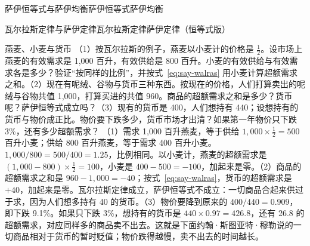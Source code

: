 \begin{compare}{萨伊恒等式与萨伊均衡}{萨伊恒等式}{萨伊均衡}
\end{compare}

\begin{compare}{瓦尔拉斯定律与萨伊定律}{瓦尔拉斯定律}{萨伊定律（恒等式版）}
\end{compare}

\begin{example}{燕麦、小麦与货币}\label{ex:say-walras}
（1）按瓦尔拉斯的例子，燕麦以小麦计的价格是 $\tfrac12$。设市场上燕麦的有效需求是 1,000 百升，有效供给是 800 百升。小麦的有效供给与有效需求各是多少？验证“按同样的比例”，并按式~\eqref{eq:say-walras} 用小麦计算超额需求之和。（2）现在有呢绒、谷物与货币三种东西。按现在的价格，人们打算卖出的呢绒与谷物共值 1,000，打算买进的共值 960。商品的超额需求之和是多少？货币呢？萨伊恒等式成立吗？（3）现有的货币是 400，人们想持有 440；设想持有的货币与物价成正比。物价要下跌多少，货币市场才出清？如果第一年物价只下跌 3\%，还有多少超额需求？
\solution （1）需求 1,000 百升燕麦，等于供给 $1{,}000\times\tfrac12=500$ 百升小麦；供给 800 百升燕麦，等于需求 400 百升小麦。$1{,}000/800=500/400=1.25$，比例相同。以小麦计，燕麦的超额需求是 $(1{,}000-800)\times\tfrac12=100$，小麦是 $400-500=-100$，加起来是零。（2）商品的超额需求之和是 $960-1{,}000=-40$；按式~\eqref{eq:say-walras}，货币的超额需求是 $+40$，加起来是零。瓦尔拉斯定律成立，萨伊恒等式不成立：一切商品合起来供过于求，因为人们想多持有 40 的货币。（3）物价要降到原来的 $400/440=0.909$，即下跌 9.1\%。如果只下跌 3\%，想持有的货币是 $440\times0.97=426.8$，还有 26.8 的超额需求，对应同样多的商品卖不出去。这就是下面约翰·斯图亚特·穆勒说的一切商品相对于货币的暂时贬值；物价跌得越慢，卖不出去的时间越长。
\end{example}

